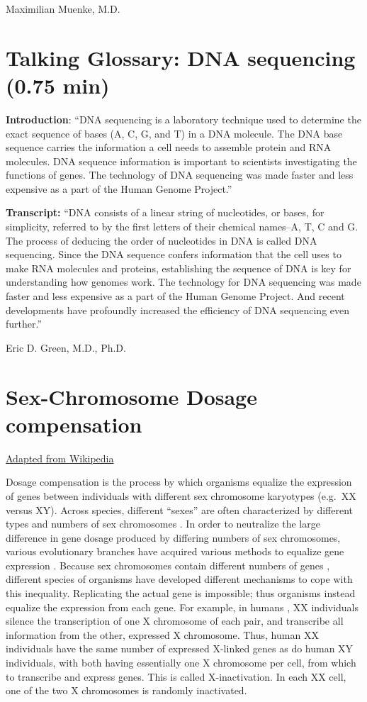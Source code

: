 \documentclass[
]{book}
\begin{document}
Maximilian Muenke, M.D.

\hypertarget{talking-glossary-dna-sequencing-0.75-min}{%
\section{Talking Glossary: DNA sequencing (0.75 min)}\label{talking-glossary-dna-sequencing-0.75-min}}

\textbf{Introduction}: ``DNA sequencing is a laboratory technique used to determine the exact sequence of bases (A, C, G, and T) in a DNA molecule. The DNA base sequence carries the information a cell needs to assemble protein and RNA molecules. DNA sequence information is important to scientists investigating the functions of genes. The technology of DNA sequencing was made faster and less expensive as a part of the Human Genome Project.''

\textbf{Transcript:} ``DNA consists of a linear string of nucleotides, or bases, for simplicity, referred to by the first letters of their chemical names--A, T, C and G. The process of deducing the order of nucleotides in DNA is called DNA sequencing. Since the DNA sequence confers information that the cell uses to make RNA molecules and proteins, establishing the sequence of DNA is key for understanding how genomes work. The technology for DNA sequencing was made faster and less expensive as a part of the Human Genome Project. And recent developments have profoundly increased the efficiency of DNA sequencing even further.''

Eric D. Green, M.D., Ph.D.

\hypertarget{sex-chromosome-dosage-compensation}{%
\section{Sex-Chromosome Dosage compensation}\label{sex-chromosome-dosage-compensation}}

\href{https://en.wikipedia.org/wiki/Sex-Chromosome_Dosage_compensation}{Adapted from Wikipedia}

Dosage compensation is the process by which organisms equalize the expression of genes between individuals with different sex chromosome karyotypes (e.g.~XX versus XY). Across species, different ``sexes'' are often characterized by different types and numbers of sex chromosomes . In order to neutralize the large difference in gene dosage produced by differing numbers of sex chromosomes, various evolutionary branches have acquired various methods to equalize gene expression . Because sex chromosomes contain different numbers of genes , different species of organisms have developed different mechanisms to cope with this inequality. Replicating the actual gene is impossible; thus organisms instead equalize the expression from each gene. For example, in humans , XX individuals silence the transcription of one X chromosome of each pair, and transcribe all information from the other, expressed X chromosome. Thus, human XX individuals have the same number of expressed X-linked genes as do human XY individuals, with both having essentially one X chromosome per cell, from which to transcribe and express genes. This is called X-inactivation. In each XX cell, one of the two X chromosomes is randomly inactivated.
\end{document}
